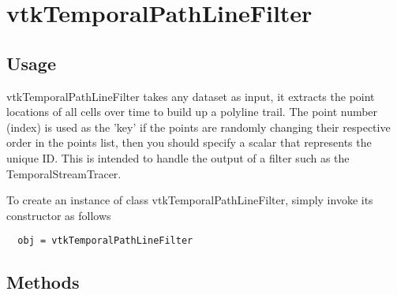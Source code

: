 \section{vtkTemporalPathLineFilter}

\subsection{Usage}

 vtkTemporalPathLineFilter takes any dataset as input, it extracts the point
 locations of all cells over time to build up a polyline trail.
 The point number (index) is used as the 'key' if the points are randomly 
 changing their respective order in the points list, then you should specify
 a scalar that represents the unique ID. This is intended to handle the output
 of a filter such as the TemporalStreamTracer.
 

To create an instance of class vtkTemporalPathLineFilter, simply
invoke its constructor as follows
\begin{verbatim}
  obj = vtkTemporalPathLineFilter
\end{verbatim}
\subsection{Methods}

